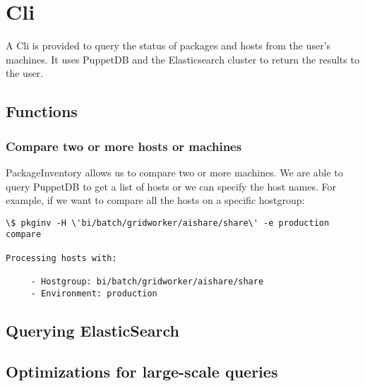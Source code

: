 \section{Cli}

A Cli is provided to query the status of packages and hosts from the
user's machines. It uses PuppetDB and the Elasticsearch cluster to return
the results to the user.

\subsection{Functions}

\subsubsection{Compare two or more hosts or machines}

PackageInventory allows us to compare two or more machines. We are able to 
query PuppetDB to get a list of hosts or we can specify the host names. For 
example, if we want to compare all the hosts on a specific hostgroup:

\begin{lstlisting}[frame=single]
\$ pkginv -H \'bi/batch/gridworker/aishare/share\' -e production compare

Processing hosts with:

     - Hostgroup: bi/batch/gridworker/aishare/share
     - Environment: production
\end{lstlisting}



\subsection{Querying ElasticSearch}
\subsection{Optimizations for large-scale queries}
